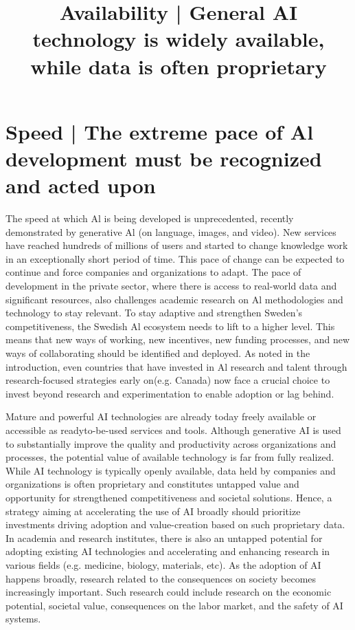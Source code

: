 \section*{Speed | The extreme pace of Al development must be recognized and acted upon}
The speed at which Al is being developed is unprecedented, recently demonstrated by generative Al (on language, images, and video). New services have reached hundreds of millions of users and started to change knowledge work in an exceptionally short period of time.
This pace of change can be expected to continue and force companies and organizations to adapt. The pace of development in the private sector, where there is access to real-world data and significant resources, also challenges academic research on Al methodologies and technology to stay relevant.
To stay adaptive and strengthen Sweden's competitiveness, the Swedish Al ecosystem needs to lift to a higher level. This means that new ways of working, new incentives, new funding processes, and new ways of collaborating should be identified and deployed.
As noted in the introduction, even countries that have invested in Al research and talent through research-focused strategies early on(e.g. Canada) now face a crucial choice to invest beyond research and experimentation to enable adoption or lag behind.

\title{
Availability | General AI technology is widely available, while data is often proprietary
}
Mature and powerful AI technologies are already today freely available or accessible as readyto-be-used services and tools. Although generative AI is used to substantially improve the quality and productivity across organizations and processes, the potential value of available technology is far from fully realized.
While AI technology is typically openly available, data held by companies and organizations is often proprietary and constitutes untapped value and opportunity for strengthened competitiveness and societal solutions. Hence, a strategy aiming at accelerating the use of AI broadly should prioritize investments driving adoption and value-creation based on such proprietary data.
In academia and research institutes, there is also an untapped potential for adopting existing AI technologies and accelerating and enhancing research in various fields (e.g. medicine, biology, materials, etc).
As the adoption of AI happens broadly, research related to the consequences on society becomes increasingly important. Such research could include research on the economic potential, societal value, consequences on the labor market, and the safety of AI systems.
